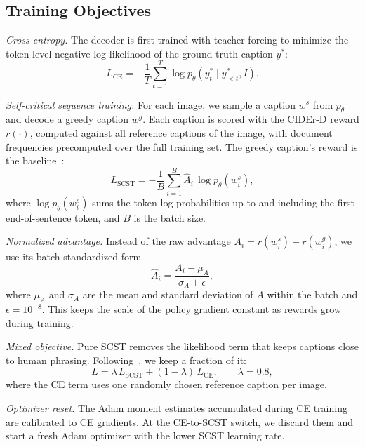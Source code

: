 \documentclass[conference]{IEEEtran}
\begin{document}
\subsection{Training Objectives}
\textit{Cross-entropy.} The decoder is first trained with teacher forcing to
minimize the token-level negative log-likelihood of the ground-truth caption
$y^{*}$:
\begin{equation}
L_{\mathrm{CE}} = -\frac{1}{T}\sum_{t=1}^{T}\log p_\theta\!\left(y^{*}_t\mid y^{*}_{<t}, I\right).
\label{eq:ce}
\end{equation}

\textit{Self-critical sequence training.} For each image, we sample a caption
$w^{s}$ from $p_\theta$ and decode a greedy caption $w^{g}$. Each caption is
scored with the CIDEr-D reward $r(\cdot)$, computed against all reference
captions of the image, with document frequencies precomputed over the full
training set. The greedy caption's reward is the
baseline~\cite{rennie2017self}:
\begin{equation}
L_{\mathrm{SCST}} = -\frac{1}{B}\sum_{i=1}^{B}\hat{A}_i\,\log p_\theta\!\left(w^{s}_i\right),
\label{eq:scst}
\end{equation}
where $\log p_\theta(w^{s}_i)$ sums the token log-probabilities up to and
including the first end-of-sentence token, and $B$ is the batch size.

\textit{Normalized advantage.} Instead of the raw advantage
$A_i = r(w^{s}_i) - r(w^{g}_i)$, we use its batch-standardized form
\begin{equation}
\hat{A}_i = \frac{A_i - \mu_A}{\sigma_A + \epsilon},
\label{eq:adv}
\end{equation}
where $\mu_A$ and $\sigma_A$ are the mean and standard deviation of $A$ within
the batch and $\epsilon=10^{-8}$. This keeps the scale of the policy gradient
constant as rewards grow during training.

\textit{Mixed objective.} Pure SCST removes the likelihood term that keeps
captions close to human phrasing. Following~\cite{paulus2018deep}, we keep a
fraction of it:
\begin{equation}
L = \lambda\,L_{\mathrm{SCST}} + (1-\lambda)\,L_{\mathrm{CE}}, \qquad \lambda = 0.8,
\label{eq:mixed}
\end{equation}
where the CE term uses one randomly chosen reference caption per image.

\textit{Optimizer reset.} The Adam moment estimates accumulated during CE
training are calibrated to CE gradients. At the CE-to-SCST switch, we discard
them and start a fresh Adam optimizer with the lower SCST learning rate.
\end{document}
